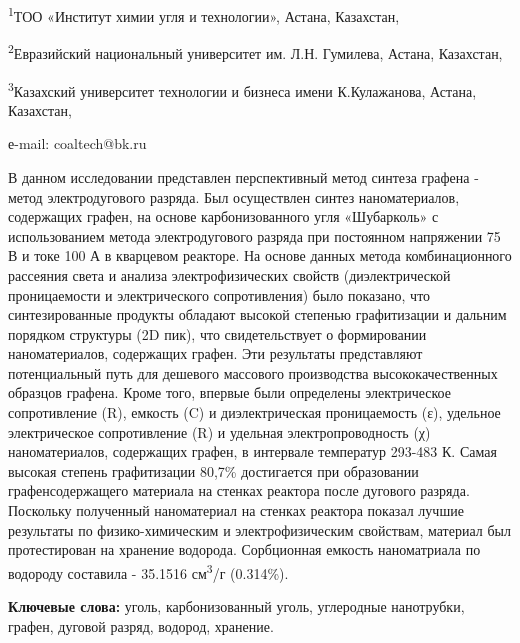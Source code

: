 \textsuperscript{1}ТОО «Институт химии угля и технологии», Астана,
Казахстан,

\textsuperscript{2}Евразийский национальный университет им. Л.Н.
Гумилева, Астана, Казахстан,

\textsuperscript{3}Казахский университет технологии и бизнеса имени
К.Кулажанова, Астана, Казахстан,

е-mail: coaltech@bk.ru

В данном исследовании представлен перспективный метод синтеза графена -
метод электродугового разряда. Был осуществлен синтез наноматериалов,
содержащих графен, на основе карбонизованного угля «Шубарколь» с
использованием метода электродугового разряда при постоянном напряжении
75 В и токе 100 А в кварцевом реакторе. На основе данных метода
комбинационного рассеяния света и анализа электрофизических свойств
(диэлектрической проницаемости и электрического сопротивления) было
показано, что синтезированные продукты обладают высокой степенью
графитизации и дальним порядком структуры (2D пик), что свидетельствует
о формировании наноматериалов, содержащих графен. Эти результаты
представляют потенциальный путь для дешевого массового производства
высококачественных образцов графена. Кроме того, впервые были определены
электрическое сопротивление (R), емкость (C) и диэлектрическая
проницаемость (ε), удельное электрическое сопротивление (R) и удельная
электропроводность (χ) наноматериалов, содержащих графен, в интервале
температур 293-483 К. Самая высокая степень графитизации 80,7\%
достигается при образовании графенсодержащего материала на стенках
реактора после дугового разряда. Поскольку полученный наноматериал на
стенках реактора показал лучшие результаты по физико-химическим и
электрофизическим свойствам, материал был протестирован на хранение
водорода. Сорбционная емкость наноматриала по водороду составила -
35.1516 см\textsuperscript{3}/г (0.314\%).

{\bfseries Ключевые слова:} уголь, карбонизованный уголь, углеродные
нанотрубки, графен, дуговой разряд, водород, хранение.

